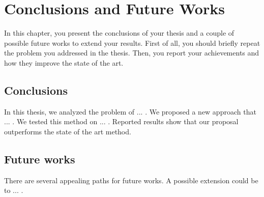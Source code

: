 \chapter{Conclusions and Future Works}
\label{ch:conclusions}

In this chapter, you present the conclusions of your thesis and a couple of possible future works to extend your results. First of all, you should briefly repeat the problem you addressed in the thesis. Then, you report your achievements and how they improve the state of the art.

\section{Conclusions}
\begin{example}
In this thesis, we analyzed the problem of ... . We proposed a new approach that ... . We tested this method on ... . Reported results show that our proposal outperforms the state of the art method.
\end{example}

\section{Future works}
\begin{example}
There are several appealing paths for future works. A possible extension could be to ... .
\end{example}
